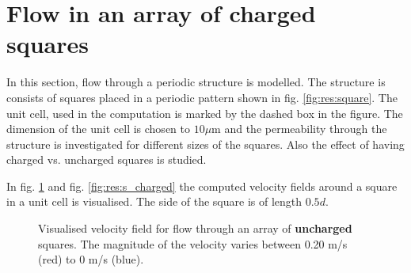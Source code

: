\section{Flow in an array of charged squares}

In this section, flow through a periodic structure is modelled. The
structure is consists of squares placed in a periodic pattern shown in
fig. \ref{fig:res:square}. The unit cell, used in the computation is
marked by the dashed box in the figure. The dimension of the unit cell
is chosen to $10 \mu$m and the permeability through the structure is
investigated for different sizes of the squares. Also the effect of
having charged vs. uncharged squares is studied. 

In fig. \ref{fig:res:s_uncharged} and fig. \ref{fig:res:s_charged} the
computed velocity fields around a square in a unit cell is
visualised. The side of the square is of length $0.5d$.   

\begin{figure}
  \centering
  \hspace{5pt} 
  \caption[Velocity field for flow through an array of
    uncharged squares.]{Visualised velocity field for flow
    through an array of \textbf{uncharged} squares. The magnitude of
    the velocity varies between 0.20 m/s (red) to 0 m/s (blue).}
  \label{fig:res:s_uncharged}
\end{figure}



